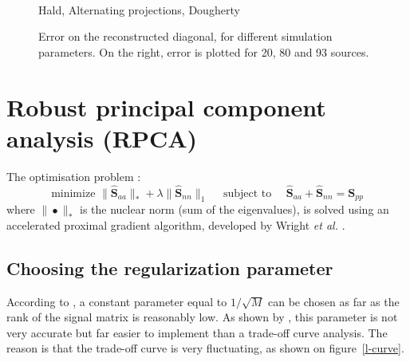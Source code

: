 \documentclass[fontsize=12pt,DIV13,paper=a4,abstract=true,titlepage=false]{scrartcl}
\newcommand{\bo}[1]{ \mathbf{#1} }
\begin{document}
\begin{figure}[H]
	\hspace{-0.1\textwidth}
	\begin{minipage}{1.2\textwidth}
		\centering
		
		\hspace{-0.2cm}
		\hspace{-0.5cm} \hfill\\
		 Hald, 
		 Alternating projections, 
		 Dougherty\\
	\end{minipage}
	\caption{ Error on the reconstructed diagonal, for different simulation parameters. On the right, error is plotted for 20, 80 and 93 sources.}
\end{figure}


\section{Robust principal component analysis (RPCA)}

The optimisation problem : 
\begin{equation}
	\text{minimize~} \|\bo{\hat{S}}_{aa} \|_* + \lambda \| \bo{\hat{S}}_{nn} \|_1  \text{~~~~subject to~~~~}  \bo{\hat{S}}_{aa} +  \bo{\hat{S}}_{nn} = \bo{S}_{pp}
	\label{rpca}
\end{equation}
where $\|\bullet\|_*$ is the nuclear norm (sum of the eigenvalues), is solved using an accelerated proximal gradient algorithm, developed by Wright \textit{et al.} \cite{Wright2009}.\\

\subsection{Choosing the regularization parameter}

According to \cite{Wright2009,Candes2011}, a constant parameter equal to $1/\sqrt{M}$ can be chosen as far as the rank of the signal matrix is reasonably low. As shown by \cite{Amailland2017phd}, this parameter is not very accurate but far easier to implement than a trade-off curve analysis. The reason is that the trade-off curve  is very fluctuating, as shown on figure~\ref{l-curve}.
\end{document}
